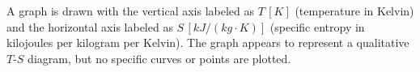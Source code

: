 A graph is drawn with the vertical axis labeled as \( T \, [K] \) (temperature in Kelvin) and the horizontal axis labeled as \( S \, [kJ/(kg \cdot K)] \) (specific entropy in kilojoules per kilogram per Kelvin). The graph appears to represent a qualitative \( T \)-\( S \) diagram, but no specific curves or points are plotted.